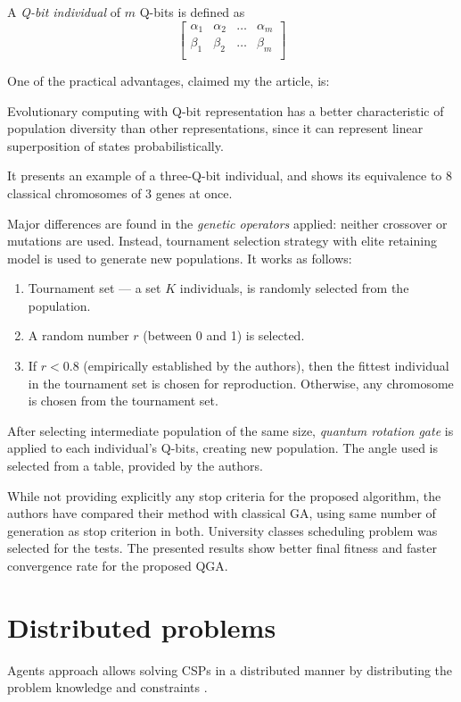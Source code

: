 \documentclass[ThesisDoc]{subfiles}
\begin{document}
A \emph{Q-bit individual} of $m$ Q-bits is defined as
\begin{equation}
\left[
  \begin{array}{cccc}
  \alpha_1 & \alpha_2 & \dots & \alpha_m \\
  \beta_1  & \beta_2  & \dots & \beta_m  \\
  \end{array}
\right]
\end{equation}

One of the practical advantages, claimed my the article, is:
\begin{displayquote}
  Evolutionary computing with Q­-bit representation has a better characteristic
  of population diversity than other representations, since it can represent
  linear superposition of states probabilistically.
\end{displayquote}
It presents an example of a three-Q-bit individual, and shows its equivalence
to 8 classical chromosomes of 3 genes at once.

\medskip\noindent
Major differences are found in the \emph{genetic operators} applied:
neither crossover or mutations are used. Instead, tournament selection strategy
with elite retaining model is used to generate new populations.
It works as follows:
\begin{enumerate}
  \item Tournament set --- a set $K$ individuals, is randomly selected from
        the population.
  \item A random number $r$ (between 0 and 1) is selected.
  \item If $r < 0.8$ (empirically established by the authors), then the fittest
        individual in the tournament set is chosen for reproduction.
        Otherwise, any chromosome is chosen from the tournament set.
\end{enumerate}
\noindent
After selecting intermediate population of the same size, \emph{quantum rotation gate}
is applied to each individual's Q-bits, creating new population.
The angle used is selected from a table, provided by the authors.

While not providing explicitly any stop criteria for the proposed algorithm,
the authors have compared their method with classical GA, using same number
of generation as stop criterion in both.
University classes scheduling problem was selected for the tests.
The presented results show better final fitness and faster convergence rate for
the proposed QGA.


\section{Distributed problems}
Agents approach allows solving CSPs in a distributed manner by distributing
the problem knowledge and constraints
\cite{DCSPagent1998, DCSP2013, CSPagent2014, MAS, MAS-Survey}.
\end{document}

